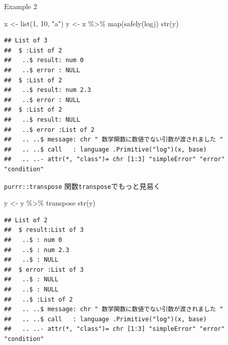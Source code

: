 \documentclass[
  ignorenonframetext,
  aspectratio=169]{beamer}
\newenvironment{Shaded}{\begin{snugshade}}{\end{snugshade}}
\newcommand{\DecValTok}[1]{\textcolor[rgb]{0.00,0.00,0.81}{#1}}
\newcommand{\FunctionTok}[1]{\textcolor[rgb]{0.00,0.00,0.00}{#1}}
\newcommand{\NormalTok}[1]{#1}
\newcommand{\OtherTok}[1]{\textcolor[rgb]{0.56,0.35,0.01}{#1}}
\newcommand{\SpecialCharTok}[1]{\textcolor[rgb]{0.00,0.00,0.00}{#1}}
\newcommand{\StringTok}[1]{\textcolor[rgb]{0.31,0.60,0.02}{#1}}
\begin{document}
\begin{frame}[fragile]{Example 2}
\protect\hypertarget{example-2-1}{}
\begin{Shaded}
\begin{Highlighting}[]
\NormalTok{x }\OtherTok{\textless{}{-}} \FunctionTok{list}\NormalTok{(}\DecValTok{1}\NormalTok{, }\DecValTok{10}\NormalTok{, }\StringTok{"a"}\NormalTok{)}
\NormalTok{y }\OtherTok{\textless{}{-}}\NormalTok{ x }\SpecialCharTok{\%\textgreater{}\%} \FunctionTok{map}\NormalTok{(}\FunctionTok{safely}\NormalTok{(log))}
\FunctionTok{str}\NormalTok{(y)}
\end{Highlighting}
\end{Shaded}

\begin{verbatim}
## List of 3
##  $ :List of 2
##   ..$ result: num 0
##   ..$ error : NULL
##  $ :List of 2
##   ..$ result: num 2.3
##   ..$ error : NULL
##  $ :List of 2
##   ..$ result: NULL
##   ..$ error :List of 2
##   .. ..$ message: chr " 数学関数に数値でない引数が渡されました "
##   .. ..$ call   : language .Primitive("log")(x, base)
##   .. ..- attr(*, "class")= chr [1:3] "simpleError" "error" "condition"
\end{verbatim}
\end{frame}

\begin{frame}[fragile]{\texttt{purrr::transpose}}
\protect\hypertarget{purrrtranspose}{}
関数\texttt{transpose}でもっと見易く

\begin{Shaded}
\begin{Highlighting}[]
\NormalTok{y }\OtherTok{\textless{}{-}}\NormalTok{ y }\SpecialCharTok{\%\textgreater{}\%}\NormalTok{ transpose}
\FunctionTok{str}\NormalTok{(y)}
\end{Highlighting}
\end{Shaded}

\begin{verbatim}
## List of 2
##  $ result:List of 3
##   ..$ : num 0
##   ..$ : num 2.3
##   ..$ : NULL
##  $ error :List of 3
##   ..$ : NULL
##   ..$ : NULL
##   ..$ :List of 2
##   .. ..$ message: chr " 数学関数に数値でない引数が渡されました "
##   .. ..$ call   : language .Primitive("log")(x, base)
##   .. ..- attr(*, "class")= chr [1:3] "simpleError" "error" "condition"
\end{verbatim}
\end{frame}
\end{document}
